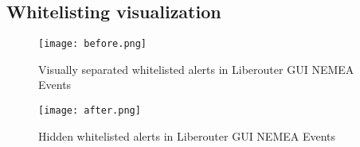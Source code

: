 \documentclass[11pt,a4paper]{article}
\begin{document}
\subsection{Whitelisting visualization}
\begin{figure}[ht]
    \texttt{[image: before.png]}
    \centering
	\caption{Visually separated whitelisted alerts in Liberouter GUI NEMEA Events}
    \label{before}
\end{figure}
\begin{figure}[ht]
    \texttt{[image: after.png]}
    \centering
	\caption{Hidden whitelisted alerts in Liberouter GUI NEMEA Events}
	\label{after}
\end{figure}
\end{document}
